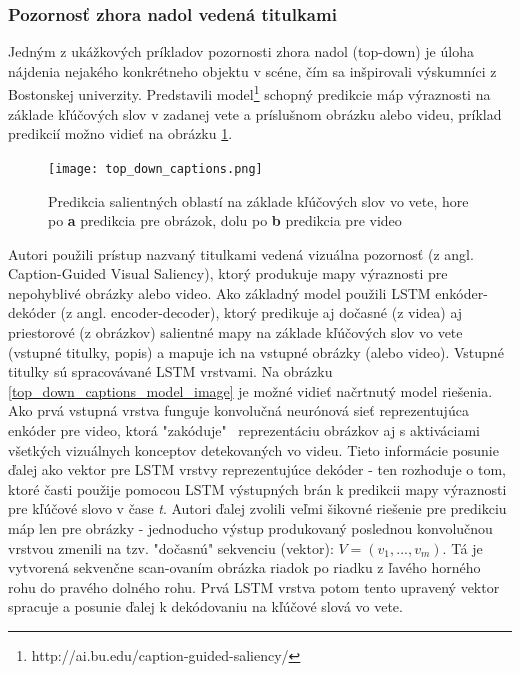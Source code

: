 \subsubsection{Pozornosť zhora nadol vedená titulkami}
\label{caption_model}
Jedným z ukážkových príkladov pozornosti zhora nadol (top-down) je úloha nájdenia nejakého konkrétneho objektu v scéne, čím sa inšpirovali výskumníci z Bostonskej univerzity. Predstavili model\footnote{http://ai.bu.edu/caption-guided-saliency/} \cite{ramanishka2017top} schopný predikcie máp výraznosti na základe kľúčových slov v zadanej vete a príslušnom obrázku alebo videu, príklad predikcií možno vidieť na obrázku \ref{top_down_captions_image}.

\begin{figure}[H]
	\begin{center}
		\texttt{[image: top\_down\_captions.png]}
		\caption[Predikcia salientných oblastí na základe kľúčových slov vo vete]{Predikcia salientných oblastí na základe kľúčových slov vo vete, hore po \textbf{a} predikcia pre obrázok, dolu po \textbf{b} predikcia pre video\cite{ramanishka2017top}\label{top_down_captions_image}}
	\end{center}
\end{figure}

Autori použili prístup nazvaný titulkami vedená vizuálna pozornosť (z angl. Caption-Guided Visual Saliency), ktorý produkuje mapy výraznosti pre nepohyblivé obrázky alebo video. Ako základný model použili LSTM enkóder-dekóder (z angl. encoder-decoder), ktorý predikuje aj dočasné (z videa) aj priestorové (z obrázkov) salientné mapy na základe kľúčových slov vo vete (vstupné titulky, popis) a mapuje ich na vstupné obrázky (alebo video). Vstupné titulky sú spracovávané LSTM vrstvami. Na obrázku \ref{top_down_captions_model_image} je možné vidieť načrtnutý model riešenia. Ako prvá vstupná vrstva funguje konvolučná neurónová sieť reprezentujúca enkóder pre video, ktorá "zakóduje" \ reprezentáciu obrázkov aj s aktiváciami všetkých vizuálnych konceptov detekovaných vo videu. Tieto informácie posunie ďalej ako vektor pre LSTM vrstvy reprezentujúce dekóder - ten rozhoduje o tom, ktoré časti použije pomocou LSTM výstupných brán k predikcii mapy výraznosti pre kľúčové slovo v čase \textit{t}. Autori ďalej zvolili veľmi šikovné riešenie pre predikciu máp len pre obrázky - jednoducho výstup produkovaný poslednou konvolučnou vrstvou zmenili na tzv. "dočasnú" sekvenciu (vektor): $V = (v_1, . . . , v_m)$. Tá je vytvorená sekvenčne scan-ovaním obrázka riadok po riadku z ľavého horného rohu do pravého dolného rohu. Prvá LSTM vrstva potom tento upravený vektor spracuje a posunie ďalej k dekódovaniu na kľúčové slová vo vete.

